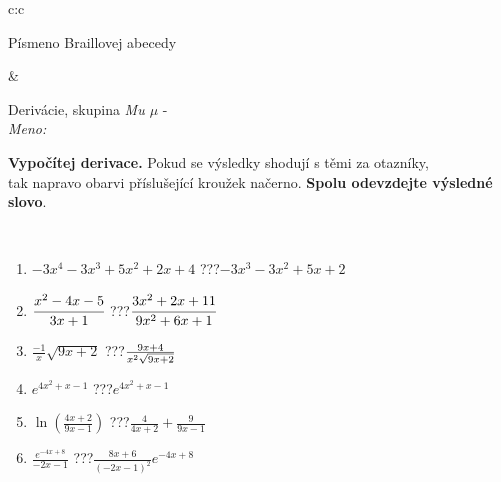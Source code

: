 \documentclass[10pt]{report}
\begin{document}
\begin{tabular}{c:c}
\begin{minipage}[c][104.5mm][t]{0.5\linewidth}
\begin{center}
\begin{minipage}{0.20\linewidth}
\begin{center}
{\small Písmeno Braillovej abecedy}
\end{center}
\end{minipage}
\end{center}
\end{minipage}
&
\begin{minipage}[c][104.5mm][t]{0.5\linewidth}
\begin{center}
\vspace{7mm}
{\huge Derivácie, skupina \textit{Mu $\mu$} -}\\[5mm]
\textit{Meno:}\phantom{xxxxxxxxxxxxxxxxxxxxxxxxxxxxxxxxxxxxxxxxxxxxxxxxxxxxxxxxxxxxxxxxx}\\[5mm]
\begin{minipage}{0.95\linewidth}
\begin{center}
\textbf{Vypočítej derivace.} Pokud se výsledky shodují s těmi za otazníky,\\tak napravo obarvi příslušející kroužek načerno. \textbf{Spolu odevzdejte výsledné slovo}.
\end{center}
\end{minipage}
\\[1mm]
\begin{minipage}{0.79\linewidth}
\begin{center}
\begin{varwidth}{\linewidth}
\begin{enumerate}
\normalsize
\item $-3x^4-3x^3+5x^2+2x+4$\quad \dotfill\; ???\;\dotfill \quad $-3x^3-3x^2+5x+2$
\item $\cfrac{x^2-4x-5}{3x+1}$\quad \dotfill\; ???\;\dotfill \quad $\cfrac{3x^2+2x+11}{9x^2+6x+1}$
\item $\frac{-1}{x}\sqrt{9x+2}$\quad \dotfill\; ???\;\dotfill \quad $\frac{9x+4}{x^2 \sqrt{\smash[b]{9x+2}}}$
\item $e^{4x^2+x-1}$\quad \dotfill\; ???\;\dotfill \quad $e^{4x^2+x-1}$
\item $\ln{\left(\frac{4x+2}{9x-1}\right)}$\quad \dotfill\; ???\;\dotfill \quad $\frac{4}{4x+2}+\frac{9}{9x-1}$
\item $\frac{e^{-4x+8}}{-2x-1}$\quad \dotfill\; ???\;\dotfill \quad $\frac{8x+6}{(-2x-1)^2}e^{-4x+8}$
\end{enumerate}
\end{varwidth}
\end{center}
\end{minipage}
\begin{minipage}{0.20\linewidth}
\begin{center}

\end{center}
\end{minipage}
\end{center}
\end{minipage}
\end{tabular}
\end{document}
